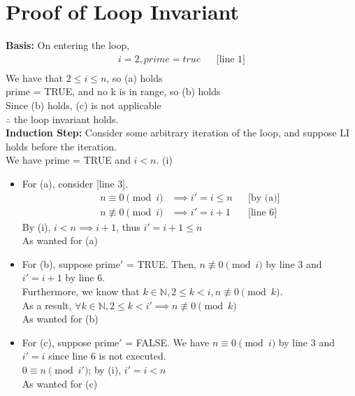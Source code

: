 \documentclass{article}
\begin{document}
	\section*{Proof of Loop Invariant}
	\textbf{Basis:} On entering the loop,\\
	\begin{align*}
	i = 2, prime = true &&\text{[line 1]}\\
	\end{align*}
	We have that $2 \leq i \leq n$, so (a) holds\\
	prime = TRUE, and no k is in range, so (b) holds\\
	Since (b) holds, (c) is not applicable\\
	$\therefore$ the loop invariant holds.\\
	\textbf{Induction Step:} Consider some arbitrary iteration of the loop, and suppose LI holds before the iteration.\\
	We have prime = TRUE and $i<n$. (i)
	\begin{itemize}
		\item For (a), consider [line 3].\\
			\begin{align*}
				n \equiv 0 \pmod{i} &\implies i' = i \leq n &&\text{[by (a)]} \\
				n \not\equiv 0 \pmod{i} &\implies i' = i+1 &&\text{[line 6]}
			\end{align*}
			By (i), $i<n \implies i+1$, thus $i' = i+1 \leq n$ \\As wanted for (a)
		\item For (b), suppose prime$'$ = TRUE. Then, $n \not\equiv 0 \pmod{i}$ by line 3 and $i' = i+1$ by line 6.\\
			Furthermore, we know that $k \in \mathbb{N}, 2 \leq k < i, n \not\equiv 0 \pmod{k}$.\\
			As a result, $\forall k \in \mathbb{N}, 2 \leq k < i' \implies n \not\equiv 0 \pmod{k}$\\
			As wanted for (b)
		\item For (c), suppose prime$'$ = FALSE. We have $n \equiv 0 \pmod{i}$ by line 3 and $i' = i$ since line 6 is not executed.\\
			$0 \equiv n \pmod{i'}$; by (i), $i' = i < n$\\
			As wanted for (c)
	\end{itemize}
\end{document}
